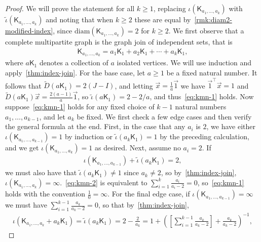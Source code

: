 \documentclass[11pt,a4paper]{article}
\newcommand{\Complete}{\mathsf{K}}
\begin{document}
    \begin{proof}
        We will prove the statement for all $k \geq 1$, replacing $\iota(\Complete_{a_1,\ldots,a_k})$ with $\widetilde{\iota}(\Complete_{a_1,\ldots,a_k})$ and noting that when $k \geq 2$ these are equal by~\cref{rmk:diam2-modified-index}, since $\mathrm{diam}(\Complete_{a_1,\ldots,a_k}) = 2$ for $k \geq 2$.
        We first observe that a complete multipartite graph is the graph join of independent sets, that is 
            \begin{align*}
                \Complete_{a_1,\ldots,a_k} = a_1\Complete_1 + a_2 \Complete_1 + \cdots + a_k\Complete_1,
            \end{align*}
        where $a\Complete_1$ denotes a collection of $a$ isolated vertices. We will use induction and apply~\cref{thm:index-join}. For the base case, let $a\ge 1$ be a fixed natural number. It follows that $\widetilde{D}(a\Complete_1) = 2(J-I)$, and letting $\vec{x} = \frac{1}{a}\vec{1}$ we have $\vec{1}^\top\vec{x} = 1$ and $\widetilde{D}(a\Complete_1)\vec{x} = \frac{2(a-1)}{a}\vec{1}$, so $\widetilde{\iota}(a\Complete_1) = 2 - 2/a$, and thus~\cref{eq:kmn-1} holds. Now suppose~\cref{eq:kmn-1} holds for any fixed choice of $k-1$ natural numbers $a_1,\dotsc,a_{k-1}$, and let $a_{k}$ be fixed. We first check a few edge cases and then verify the general formula at the end. First, in the case that any $a_i$ is $2$, we have either $\iota(\Complete_{a_1,\ldots,a_{k-1}}) = 1$ by induction or $\widetilde{\iota}(a_k\Complete_1) = 1$ by the preceding calculation, and we get $\iota(\Complete_{a_1,\ldots,a_k}) = 1$ as desired. Next, assume no $a_i=2$. If
            \begin{align}\label{eq:kmn-2}
                \iota(\Complete_{a_1,\ldots,a_{k-1}}) + \widetilde{\iota}(a_k\Complete_1) = 2,
            \end{align}
        we must also have that $\widetilde{\iota}(a_k\Complete_1) \neq 1$ since $a_k\neq 2$, so by~\cref{thm:index-join}, $\iota(\Complete_{a_1,\ldots,a_k}) = \infty$.~\cref{eq:kmn-2} is equivalent to $\sum_{i=1}^k\frac{a_i}{a_i - 2} = 0$, so~\cref{eq:kmn-1} holds with the convention $\tfrac{1}{0}=\infty$. For the final edge case, if $\iota(\Complete_{a_1,\ldots,a_{k-1}}) = \infty$ we must have $\sum_{i=1}^{k-1}\frac{a_k}{a_k - 2} = 0$, so that by~\cref{thm:index-join},
            \begin{align*}
                \iota(\Complete_{a_1,\ldots,a_k} + a_k\Complete_1) = \widetilde{\iota}(a_k\Complete_1) = 2 - \frac{2}{a_k} = 1 + \left(\left[\sum_{i=1}^{k-1}\frac{a_k}{a_k - 2}\right]+\frac{a_k}{a_k-2}\right)^{-1},

\end{align*}
\end{proof}
\end{document}
